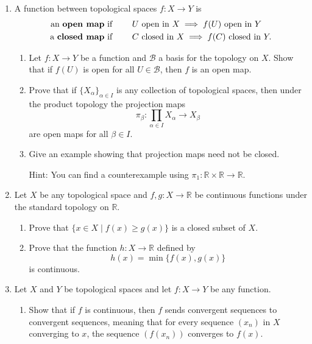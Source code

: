 \documentclass[12pt]{article}
\newcommand{\R}{\mathbb{R}}
\newcommand{\B}{\mathscr{B}}
\theoremstyle{definition}
\begin{document}
\begin{enumerate}[roomy]
\item A function between topological spaces $f \colon X \to Y$ is 
\[ 
\begin{aligned}
\text{an {\bf open map} if } & \hspace{2em} U \text{ open in } X \implies f(U) \text{ open in } Y	 \\
\text{a {\bf closed map} if } & \hspace{2em} C \text{ closed in } X \implies f(C) \text{ closed in } Y.
\end{aligned}
\]

\begin{enumerate}

\item Let $f \colon X \longrightarrow Y$ be a function and $\B$ a basis for the topology on $X$. Show that if $f(U)$ is open for all $U \in \B$, then $f$ is an open map.

\item Prove that if $\{ X_\alpha \}_{\alpha \in I}$ is any collection of topological spaces, then under the product topology the projection maps
\[ \pi_\beta \colon \prod_{\alpha \in I} X_\alpha \to X_\beta\] 
are open maps for all $\beta \in I$.
  
 
\item Give an example showing that projection maps need not be closed.

\noindent
Hint: You can find a counterexample using $\pi_1 \colon \R \times \R \to \R$.
\end{enumerate}



\item Let $X$ be any topological space and $f,g \colon X \longrightarrow \R$ be continuous functions under the standard topology on $\R$.

\begin{enumerate}
\item Prove that $\{x \in X \mid f(x) \geqslant g(x)\}$ is a closed subset of $X$.
  
\item Prove that the function $h \colon X \longrightarrow \R$ defined by
\[ h(x) = \min\{f(x), g(x)\}\] 
is continuous. 
\end{enumerate}


\item Let $X$ and $Y$ be topological spaces and let $f \colon X \longrightarrow Y$ be any function.

\begin{enumerate}
	\item Show that if $f$ is continuous, then $f$ sends convergent sequences to convergent sequences, meaning that for every sequence $(x_n)$ in $X$ converging to $x$, the sequence $(f(x_n))$ converges to $f(x)$.


\end{enumerate}
\end{enumerate}
\end{document}
